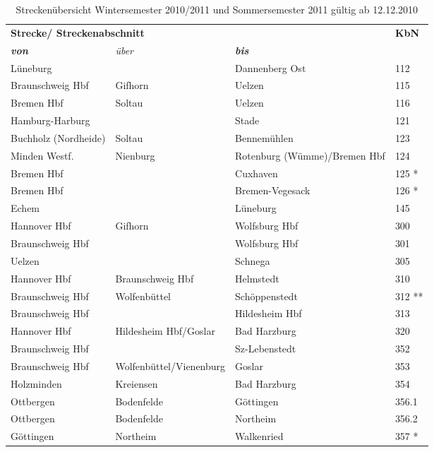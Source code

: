 \newpage
\begin{table}[htbp]
\caption*{Streckenübersicht Wintersemester 2010/2011 und Sommersemester
 2011 gültig ab 12.12.2010}
\begin{center}
\begin{tabular}{|l|l|l|p{1cm}|}
\hline
\multicolumn{3}{|l|}{\textbf{Strecke/ Streckenabschnitt}}& \textbf{KbN}\\
\textbf{\textit{von}} & \textit{über} & \textbf{\textit{bis}} & \\ \cline{ 1- 4}
Lüneburg &  & Dannenberg Ost & 112 \\ \hline
Braunschweig Hbf & Gifhorn & Uelzen & 115 \\ \hline
Bremen Hbf & Soltau & Uelzen & 116 \\ \hline
Hamburg-Harburg &  & Stade & 121 \\ \hline
Buchholz (Nordheide) & Soltau & Bennemühlen & 123 \\ \hline
Minden Westf. & Nienburg & Rotenburg (Wümme)/Bremen Hbf & 124 \\ \hline
Bremen Hbf &  & Cuxhaven & 125 * \\ \hline
Bremen Hbf &  & Bremen-Vegesack & 126 * \\ \hline
Echem &  & Lüneburg & 145 \\ \hline
Hannover Hbf & Gifhorn & Wolfsburg Hbf & 300 \\ \hline
Braunschweig Hbf &  & Wolfsburg Hbf & 301 \\ \hline
Uelzen &  & Schnega & 305 \\ \hline
Hannover Hbf & Braunschweig Hbf & Helmstedt & 310 \\ \hline
Braunschweig Hbf & Wolfenbüttel & Schöppenstedt & 312 ** \\ \hline
Braunschweig Hbf &  & Hildesheim Hbf & 313 \\ \hline
Hannover Hbf & Hildesheim Hbf/Goslar & Bad Harzburg & 320 \\ \hline
Braunschweig Hbf &  & Sz-Lebenstedt & 352 \\ \hline
Braunschweig Hbf & Wolfenbüttel/Vienenburg & Goslar & 353 \\ \hline
Holzminden & Kreiensen & Bad Harzburg & 354 \\ \hline
Ottbergen & Bodenfelde & Göttingen & 356.1 \\ \hline
Ottbergen & Bodenfelde & Northeim & 356.2 \\ \hline
Göttingen & Northeim & Walkenried & 357 * \\ \hline

\end{tabular}
\end{center}
\end{table}
